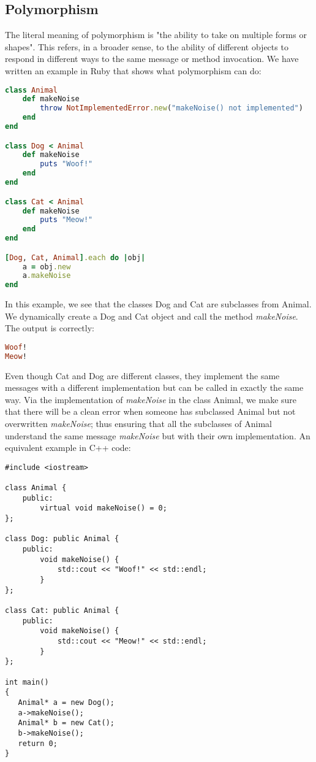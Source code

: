 \documentclass[10pt,a4paper,twocolumn]{article}
\begin{document}
\subsection{Polymorphism}
The literal meaning of polymorphism is "the ability to take on multiple forms or shapes". This refers, in a broader sense, to the ability of different objects to respond in different ways to the same message or method invocation. We have written an example in Ruby that shows what polymorphism can do:

\begin{lstlisting}[language=Ruby]
class Animal
	def makeNoise
		throw NotImplementedError.new("makeNoise() not implemented")
	end
end

class Dog < Animal
	def makeNoise
		puts "Woof!"
	end
end

class Cat < Animal
	def makeNoise
		puts "Meow!"
	end
end

[Dog, Cat, Animal].each do |obj|
	a = obj.new
	a.makeNoise
end
\end{lstlisting}

In this example, we see that the classes Dog and Cat are subclasses from Animal. We dynamically create a Dog and Cat object and call the method \textit{makeNoise}. The output is correctly:

\begin{lstlisting}[language=Ruby]
Woof!
Meow!
\end{lstlisting}

Even though Cat and Dog are different classes, they implement the same messages with a different implementation but can be called in exactly the same way. Via the implementation of \textit{makeNoise} in the class Animal, we make sure that there will be a clean error when someone has subclassed Animal but not overwritten \textit{makeNoise}; thus ensuring that all the subclasses of Animal understand the same message \textit{makeNoise} but with their own implementation. An equivalent example in C++ code:

\begin{lstlisting}
#include <iostream>

class Animal {
	public:
		virtual void makeNoise() = 0;
};

class Dog: public Animal {
	public:
		void makeNoise() {
			std::cout << "Woof!" << std::endl;
		}
};

class Cat: public Animal {
	public:
		void makeNoise() {
			std::cout << "Meow!" << std::endl;
		}
};
 
int main()
{
   Animal* a = new Dog();
   a->makeNoise();
   Animal* b = new Cat();
   b->makeNoise();
   return 0;
}
\end{lstlisting}
\end{document}
